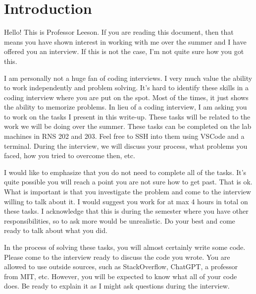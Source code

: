 \documentclass{article}
\begin{document}
\pagestyle{fancy}

\section*{Introduction}
Hello! This is Professor Leeson. 
If you are reading this document, then that means you have shown interest in working with me over the summer and I have offered you an interview.
If this is not the case, I'm not quite sure how you got this.

I am personally not a huge fan of coding interviews. 
I very much value the ability to work independently and problem solving.
It's hard to identify these skills in a coding interview where you are put on the spot.
Most of the times, it just shows the ability to memorize problems.
In lieu of a coding interview, I am asking you to work on the tasks I present in this write-up.
These tasks will be related to the work we will be doing over the summer.
These tasks can be completed on the lab machines in RNS 202 and 203.
Feel free to SSH into them using VSCode and a terminal.
During the interview, we will discuss your process, what problems you faced, how you tried to overcome then, etc.

I would like to emphasize that you do not need to complete all of the tasks.
It's quite possible you will reach a point you are not sure how to get past.
That is ok.
What is important is that you investigate the problem and come to the interview willing to talk about it.
I would suggest you work for at max 4 hours in total on these tasks.
I acknowledge that this is during the semester where you have other responsibilities, so to ask more would be unrealistic.
Do your best and come ready to talk about what you did.

In the process of solving these tasks, you will almost certainly write some code.
Please come to the interview ready to discuss the code you wrote.
You are allowed to use outside sources, such as StackOverflow, ChatGPT, a professor from MIT, etc.
However, you will be expected to know what all of your code does.
Be ready to explain it as I might ask questions during the interview.
\end{document}
